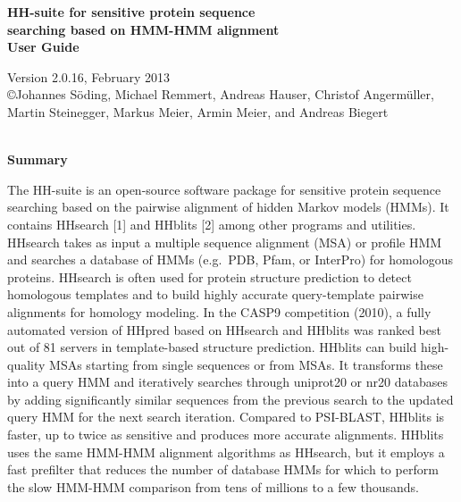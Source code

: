 \documentclass[11pt,a4paper]{article}
\newcommand{\hhversion}{Version 2.0.16, February 2013}
\begin{document}


\begin{center}

\vspace{20mm}
 
{\huge \bf HH-suite for sensitive protein sequence\\[2mm] searching based on HMM-HMM alignment}\\[4mm] 

{\Large \bf User Guide}

  \hhversion\\[2mm]
{\copyright  Johannes S\"oding, Michael Remmert, Andreas Hauser, Christof Angerm\"uller, Martin Steinegger, Markus Meier, Armin Meier, and Andreas Biegert}\\[2mm]\


{\bf \Large Summary}

\end{center}

\noindent The HH-suite is an open-source software package for sensitive protein sequence searching based on the pairwise alignment of hidden Markov models (HMMs). It contains HHsearch [1] and HHblits [2] among other programs and utilities. HHsearch takes as input a multiple sequence alignment (MSA) or profile HMM and searches a database of HMMs (e.g.\ PDB, Pfam, or InterPro) for homologous proteins. HHsearch is often used for protein structure prediction to detect homologous templates and to build highly accurate query-template pairwise alignments for homology modeling. In the CASP9 competition (2010), a fully automated version of HHpred based on HHsearch and HHblits was ranked best out of 81 servers in template-based structure prediction. HHblits can build high-quality MSAs starting from single sequences or from MSAs. It transforms these into a query HMM and iteratively searches through uniprot20 or nr20 databases by adding significantly similar sequences from the previous search to the updated query HMM for the next search iteration. Compared to PSI-BLAST, HHblits is faster, up to twice as sensitive and produces more accurate alignments. HHblits uses the same HMM-HMM alignment algorithms as HHsearch, but it employs a fast prefilter that reduces the number of database HMMs for which to perform the slow HMM-HMM comparison from tens of millions to a few thousands. 
\\[2mm]
\end{document}
